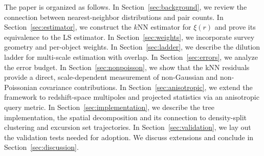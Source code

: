 The paper is organized as follows.  In Section~\ref{sec:background}, we review the connection between nearest-neighbor distributions and pair counts.  In Section~\ref{sec:estimator}, we construct the $k$NN estimator for $\xi(r)$ and prove its equivalence to the LS estimator.  In Section~\ref{sec:weights}, we incorporate survey geometry and per-object weights.  In Section~\ref{sec:ladder}, we describe the dilution ladder for multi-scale estimation with overlap.  In Section~\ref{sec:errors}, we analyze the error budget.  In Section~\ref{sec:nonpoisson}, we show that the kNN residuals provide a direct, scale-dependent measurement of non-Gaussian and non-Poissonian covariance contributions.  In Section~\ref{sec:anisotropic}, we extend the framework to redshift-space multipoles and projected statistics via an anisotropic query metric.  In Section~\ref{sec:implementation}, we describe the tree implementation, the spatial decomposition and its connection to density-split clustering and excursion set trajectories.  In Section~\ref{sec:validation}, we lay out the validation tests needed for adoption.  We discuss extensions and conclude in Section~\ref{sec:discussion}.
